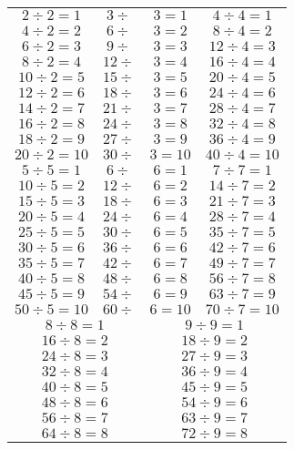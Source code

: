 \begin{longtable}{|c|c@{}c|c|}
\hline
$2\div2=1$& $3\div$&$3=1$  &  $4\div4=1$\\
$4\div2=2$ & $6\div$&$3=2$ & $8\div4=2$\\
$6\div2=3$ & $9\div$&$3=3$ & $12\div4=3$\\
$8\div2=4$ & $12\div$&$3=4$ & $16\div4=4$\\
$10\div2=5$ & $15\div$&$3=5$ & $20\div4=5$\\
$12\div2=6$ &$18\div$&$3=6$ & $24\div4=6$\\
$14\div2=7$  &$21\div$&$3=7$ & $28\div4=7$\\
$16\div2=8$  &$24\div$&$3=8$ & $32\div4=8$\\
$18\div2=9$  &$27\div$&$3=9$ & $36\div4=9$\\
$20\div2=10$ &$30\div$&$3=10$ & $40\div4=10$\\
\hline
$5\div5=1$ & $6\div$&$6=1$ & $7\div7=1$\\
$10\div5=2$ & $12\div$&$6=2$ & $14\div7=2$\\
$15\div5=3$ & $18\div$&$6=3$ & $21\div7=3$\\
$20\div5=4$ & $24\div$&$6=4$ & $28\div7=4$\\
$25\div5=5$ & $30\div$&$6=5$ & $35\div7=5$\\
$30\div5=6$ & $36\div$&$6=6$ & $42\div7=6$\\
$35\div5=7$ & $42\div$&$6=7$ &  $49\div7=7$\\
$40\div5=8$ & $48\div$&$6=8$ &  $56\div7=8$\\
$45\div5=9$ & $54\div$&$6=9$ &  $63\div7=9$\\
$50\div5=10$ & $60\div$&$6=10$ & $70\div7=10$\\
\hline
\multicolumn{2}{|c|}{$8\div8=1$} &\multicolumn{2}{c|}{$9\div9=1$}\\
\multicolumn{2}{|c|}{$16\div8=2$} &\multicolumn{2}{c|}{$18\div9=2$}\\
\multicolumn{2}{|c|}{$24\div8=3$} &\multicolumn{2}{c|}{$27\div9=3$}\\
\multicolumn{2}{|c|}{$32\div8=4$} &\multicolumn{2}{c|}{$36\div9=4$}\\
\multicolumn{2}{|c|}{$40\div8=5$} &\multicolumn{2}{c|}{$45\div9=5$}\\
\multicolumn{2}{|c|}{$48\div8=6$} &\multicolumn{2}{c|}{$54\div9=6$}\\
\multicolumn{2}{|c|}{$56\div8=7$} &\multicolumn{2}{c|}{$63\div9=7$}\\
\multicolumn{2}{|c|}{$64\div8=8$} &\multicolumn{2}{c|}{$72\div9=8$}\\

\end{longtable}
